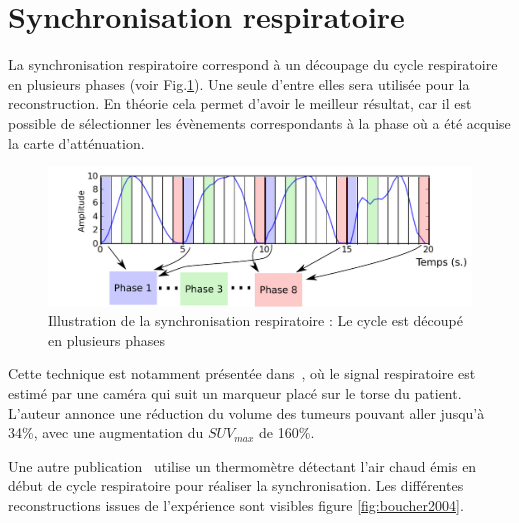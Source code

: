 \label{lab:corrMvt}
\section{Synchronisation respiratoire}

La synchronisation respiratoire correspond à un découpage du cycle respiratoire en plusieurs phases (voir Fig.\ref{fig:gatingRespi}). Une seule d'entre elles sera utilisée pour la reconstruction. En théorie cela permet d'avoir le meilleur résultat, car il est possible de sélectionner les évènements correspondants à la phase où a été acquise la carte d'atténuation.


\begin{figure}[h!]
	\begin{center}
		\includegraphics[width=12cm]{images/ET-IM}
	\end{center}
	\caption{Illustration de la synchronisation respiratoire : Le cycle est découpé en plusieurs phases} 
	\label{fig:gatingRespi}
\end{figure}



Cette technique est notamment présentée dans~\cite{nehmeh2002effect}, où le signal respiratoire est estimé par une caméra qui suit un marqueur placé sur le torse du patient. L'auteur annonce une réduction du volume des tumeurs pouvant aller jusqu'à 34\%, avec une augmentation du $SUV_{max}$ de 160\%. 

Une autre publication~\cite{boucher2004respiratory} utilise un thermomètre détectant l'air chaud émis en début de cycle respiratoire pour réaliser la synchronisation. Les différentes reconstructions issues de l'expérience sont visibles figure \ref{fig:boucher2004}.

